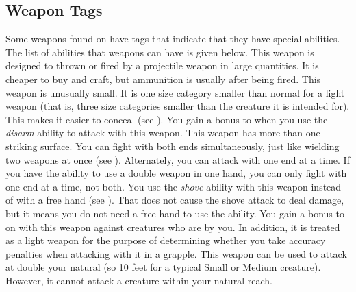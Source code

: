     \subsection{Weapon Tags}\label{Weapon Tags}
        Some weapons found on  have tags that indicate that they have special abilities. The list of abilities that weapons can have is given below.
         This weapon is designed to thrown or fired by a projectile weapon in large quantities. It is cheaper to buy and craft, but ammunition is usually  after being fired.
         This weapon is unusually small. It is one size category smaller than normal for a light weapon (that is, three size categories smaller than the creature it is intended for). This makes it easier to conceal (see ).
         You gain a  bonus to  when you use the \textit{disarm} ability to attack with this weapon.
         This weapon has more than one striking surface. You can fight with both ends simultaneously, just like wielding two weapons at once (see ). Alternately, you can attack with one end at a time. If you have the ability to use a double weapon in one hand, you can only fight with one end at a time, not both.
         You use the \textit{shove} ability with this weapon instead of with a free hand (see ).
        That does not cause the shove attack to deal damage, but it means you do not need a free hand to use the ability.
         You gain a  bonus to  on  with this weapon against creatures who are  by you.
        In addition, it is treated as a light weapon for the purpose of determining whether you take accuracy penalties when attacking with it in a grapple.
        \label{Long Weapon} This weapon can be used to attack at double your natural  (so 10 feet for a typical Small or Medium creature).
        However, it cannot attack a creature within your natural reach.

